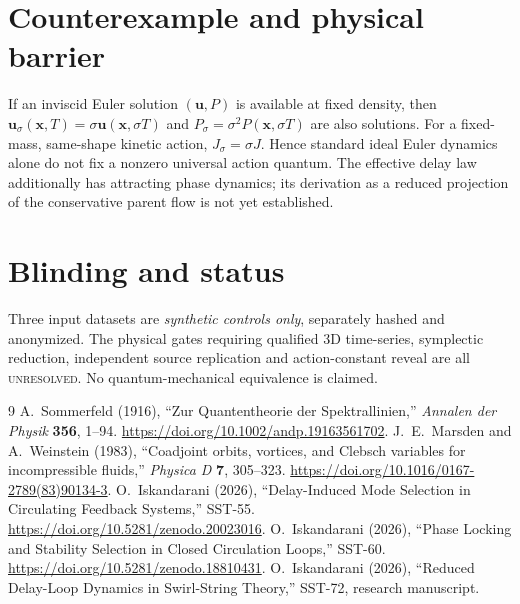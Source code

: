 \documentclass[11pt]{article}
\begin{document}
\section{Counterexample and physical barrier}
If an inviscid Euler solution $(\mathbf u,P)$ is available at fixed density, then $\mathbf u_\sigma(\mathbf x,T)=\sigma\mathbf u(\mathbf x,\sigma T)$ and $P_\sigma=\sigma^2P(\mathbf x,\sigma T)$ are also solutions. For a fixed-mass, same-shape kinetic action, $J_\sigma=\sigma J$. Hence standard ideal Euler dynamics alone do not fix a nonzero universal action quantum. The effective delay law additionally has attracting phase dynamics; its derivation as a reduced projection of the conservative parent flow is not yet established.
\section{Blinding and status}
Three input datasets are \emph{synthetic controls only}, separately hashed and anonymized. The physical gates requiring qualified 3D time-series, symplectic reduction, independent source replication and action-constant reveal are all \textsc{unresolved}. No quantum-mechanical equivalence is claimed.
\begin{thebibliography}{9}
 A.~Sommerfeld (1916), ``Zur Quantentheorie der Spektrallinien,'' \emph{Annalen der Physik} \textbf{356}, 1--94. \url{https://doi.org/10.1002/andp.19163561702}.
 J.~E.~Marsden and A.~Weinstein (1983), ``Coadjoint orbits, vortices, and Clebsch variables for incompressible fluids,'' \emph{Physica D} \textbf{7}, 305--323. \url{https://doi.org/10.1016/0167-2789(83)90134-3}.
 O.~Iskandarani (2026), ``Delay-Induced Mode Selection in Circulating Feedback Systems,'' SST-55. \url{https://doi.org/10.5281/zenodo.20023016}.
 O.~Iskandarani (2026), ``Phase Locking and Stability Selection in Closed Circulation Loops,'' SST-60. \url{https://doi.org/10.5281/zenodo.18810431}.
 O.~Iskandarani (2026), ``Reduced Delay-Loop Dynamics in Swirl-String Theory,'' SST-72, research manuscript.
\end{thebibliography}
\end{document}

